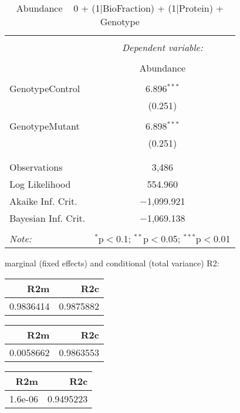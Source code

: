 \documentclass[11pt]{report}
\begin{document}
\begin{table}[!htbp] \centering 
  \caption{Abundance ~ 0 + (1|BioFraction) + (1|Protein) + Genotype} 
  \label{} 
\begin{tabular}{@{\extracolsep{5pt}}lc} 
\\[-1.8ex]\hline 
\hline \\[-1.8ex] 
 & \multicolumn{1}{c}{\textit{Dependent variable:}} \\ 
\cline{2-2} 
\\[-1.8ex] & Abundance \\ 
\hline \\[-1.8ex] 
 GenotypeControl & 6.896$^{***}$ \\ 
  & (0.251) \\ 
  & \\ 
 GenotypeMutant & 6.898$^{***}$ \\ 
  & (0.251) \\ 
  & \\ 
\hline \\[-1.8ex] 
Observations & 3,486 \\ 
Log Likelihood & 554.960 \\ 
Akaike Inf. Crit. & $-$1,099.921 \\ 
Bayesian Inf. Crit. & $-$1,069.138 \\ 
\hline 
\hline \\[-1.8ex] 
\textit{Note:}  & \multicolumn{1}{r}{$^{*}$p$<$0.1; $^{**}$p$<$0.05; $^{***}$p$<$0.01} \\ 
\end{tabular} 
\end{table} 
marginal (fixed effects) and conditional (total variance) R2:

\begin{tabular}{r|r}
\hline
R2m & R2c\\
\hline
0.9836414 & 0.9875882\\
\hline
\end{tabular}

\begin{tabular}{r|r}
\hline
R2m & R2c\\
\hline
0.0058662 & 0.9863553\\
\hline
\end{tabular}

\begin{tabular}{r|r}
\hline
R2m & R2c\\
\hline
1.6e-06 & 0.9495223\\
\hline
\end{tabular}
\end{document}
